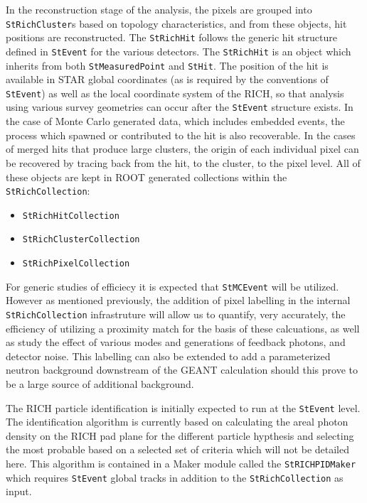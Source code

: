 \documentclass[twoside]{article}
\begin{document}
In the reconstruction stage of the analysis, the pixels are grouped
into \texttt{StRichCluster}s based on topology characteristics,
and from these objects, hit positions are reconstructed.
The \texttt{StRichHit}
follows the generic hit structure defined in \texttt{StEvent} for
the various detectors.  The \texttt{StRichHit} is an object
which inherits from both \texttt{StMeasuredPoint} and
\texttt{StHit}.  The position of the hit is available in STAR global
coordinates (as is required by the conventions of \texttt{StEvent})
as well as the local coordinate system of the RICH, so that analysis
using various survey geometries can occur after the \texttt{StEvent}
structure exists.  In the case of Monte Carlo generated data, which
includes embedded events, the process which spawned or contributed to
the hit is also recoverable.  In the cases of merged hits that produce
large clusters, the origin of each individual pixel can be recovered
by tracing back from the hit, to the cluster, to the pixel level.
All of these objects are kept in ROOT generated collections within
the \texttt{StRichCollection}:
\begin{itemize}
    \item \texttt{StRichHitCollection}
    \item \texttt{StRichClusterCollection}
    \item \texttt{StRichPixelCollection}
\end{itemize}
For generic studies of efficiecy
it is expected that \texttt{StMCEvent} will be utilized.  However as
mentioned previously, the addition
of pixel labelling in the internal \texttt{StRichCollection} infrastruture
will allow us to quantify, very accurately, the efficiency of utilizing
a proximity match for the basis of these calcuations, as well as study
the effect of various modes and generations of feedback photons, and
detector noise.  This labelling can also be extended to add a
parameterized neutron
background downstream of the GEANT calculation should this prove to
be a large source of additional background.

The RICH particle identification is initially expected to run
at the \texttt{StEvent} level.  The identification algorithm is currently
based on calculating the areal photon density on the RICH pad
plane for the different particle hypthesis and selecting the
most probable based on a selected set of criteria which will
not be detailed here.  This algorithm is contained in a
Maker module called the \texttt{StRICHPIDMaker} which requires
\texttt{StEvent} global tracks in addition to the \texttt{StRichCollection}
as input.
\end{document}

